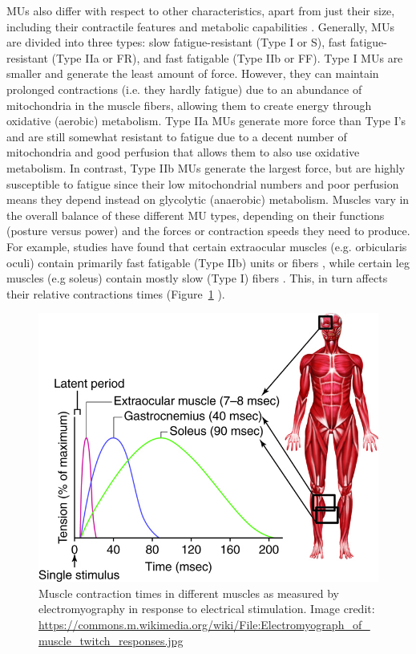 \documentclass{article}
\begin{document}
MUs also differ with respect to other characteristics, apart from just their size, including their contractile features and metabolic capabilities \citep{Weinberger2010} . Generally, MUs are divided into three types: slow fatigue-resistant (Type I or S), fast fatigue-resistant (Type IIa or FR), and fast fatigable (Type IIb or FF). Type I MUs are smaller and generate the least amount of force. However, they can maintain prolonged contractions (i.e. they hardly fatigue) due to an abundance of mitochondria in the muscle fibers, allowing them to create energy through oxidative (aerobic) metabolism. Type IIa MUs generate more force than Type I's and are still somewhat resistant to fatigue due to a decent number of mitochondria and good perfusion that allows them to also use oxidative metabolism. In contrast, Type IIb MUs generate the largest force, but are highly susceptible to fatigue since their low mitochondrial numbers and poor perfusion means they depend instead on glycolytic (anaerobic) metabolism. Muscles vary in the overall balance of these different MU types, depending on their functions (posture versus power) and the forces or contraction speeds they need to produce. For example, studies have found that certain extraocular muscles (e.g. orbicularis oculi) contain primarily fast fatigable (Type IIb) units or fibers \citep{tong2024anatomy}, while certain leg muscles (e.g soleus) contain mostly slow (Type I) fibers \citep{Weinberger2010}. This, in turn affects their relative contractions times (Figure~\ref{WuEQUeZj3K} ).

\begin{figure}[!htbp]
\centering
\includegraphics[width=0.7\linewidth]{files/EPpXta8zJdzN048lz8AR-d9dc00d816c074c6bec6802c66922e89.jpeg}
\caption[]{Muscle contraction times in different muscles as measured by electromyography in response to electrical stimulation. Image credit: \href{https://commons.m.wikimedia.org/wiki/File:Electromyograph\_of\_muscle\_twitch\_responses.jpg}{https://commons.m.wikimedia.org/wiki/File:Electromyograph\_of\_muscle\_twitch\_responses.jpg}}
\label{WuEQUeZj3K}
\end{figure}
\end{document}
